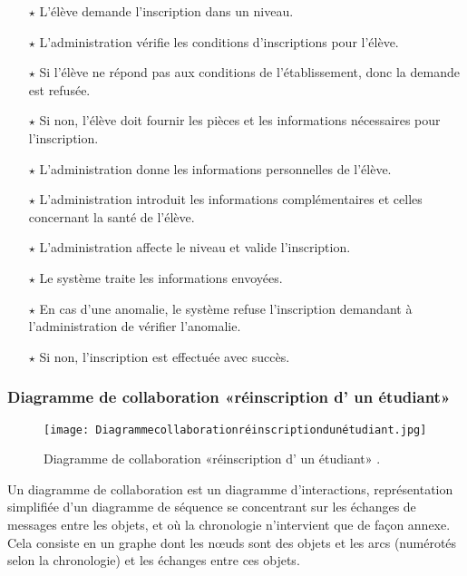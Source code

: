 \begin{itemize}	
\item[$\star$]L’élève demande l’inscription dans un niveau.
\item[$\star$] L’administration vérifie les conditions d’inscriptions pour l’élève.
\item[$\star$] Si l’élève ne répond pas aux conditions de l’établissement, donc la demande est refusée.
\item[$\star$] Si non, l’élève doit fournir les pièces et les informations nécessaires pour
l’inscription.
\item[$\star$] L’administration donne les informations personnelles de l’élève.
\item[$\star$] L’administration introduit les informations complémentaires et celles concernant la santé de l’élève.
\item[$\star$] L’administration affecte le niveau et valide l’inscription.
\item[$\star$] Le système traite les informations envoyées.
\item[$\star$] En cas d’une anomalie, le système refuse l’inscription demandant à l’administration de vérifier l’anomalie.
\item[$\star$] Si non, l’inscription est effectuée avec succès.
\end{itemize}	
\subsubsection{Diagramme de collaboration «réinscription d' un étudiant»}
\begin{figure}[ht]
	\centering
	\texttt{[image: Diagrammecollaborationréinscriptiondunétudiant.jpg]}
	\caption{Diagramme de collaboration «réinscription d' un étudiant» .}
	\label{fig:Diagramme de collaboration réinscription d' un étudiant  }
\end{figure}
\FloatBarrier


Un diagramme de collaboration est un diagramme d'interactions, représentation simplifiée d'un diagramme de séquence se concentrant sur les échanges de messages entre les objets, et où la chronologie n'intervient que de façon annexe.\\
Cela consiste en un graphe dont les nœuds sont des objets et les arcs (numérotés selon la chronologie) et les échanges entre ces objets.




